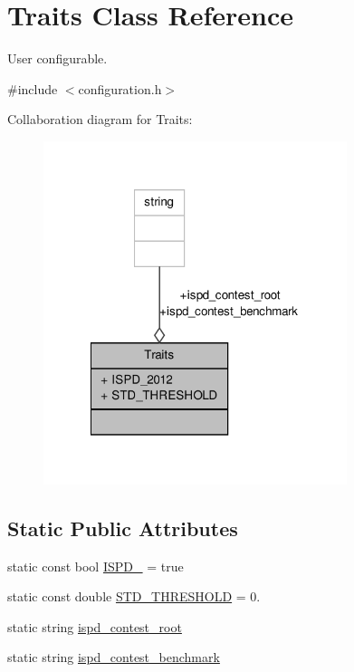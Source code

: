 \hypertarget{classTraits}{\section{Traits Class Reference}
\label{classTraits}
}


User configurable.  




{\ttfamily \#include $<$configuration.\-h$>$}



Collaboration diagram for Traits\-:\nopagebreak
\begin{figure}[H]
\begin{center}
\leavevmode
\includegraphics[width=251pt]{classTraits__coll__graph}
\end{center}
\end{figure}
\subsection*{Static Public Attributes}
\begin{DoxyCompactItemize}
\item 
static const bool \hyperlink{classTraits_a6be4a9876454c3e6e139e7d213a74884}{I\-S\-P\-D\-\_} = true
\item 
static const double \hyperlink{classTraits_ab7f403f849da178fd4c1995084f3709b}{S\-T\-D\-\_\-\-T\-H\-R\-E\-S\-H\-O\-L\-D} = 0.
\item 
static string \hyperlink{classTraits_a418b8b76f68ab0a74e58119f32330547}{ispd\-\_\-contest\-\_\-root}
\item 
static string \hyperlink{classTraits_af167fe41eea5cdd9e190a0807f39b3f4}{ispd\-\_\-contest\-\_\-benchmark}
\end{DoxyCompactItemize}


